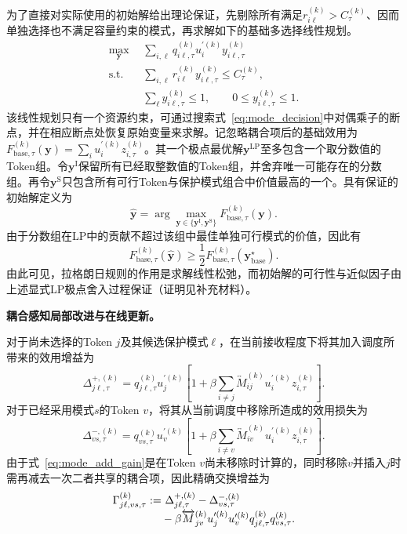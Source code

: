 \documentclass[journal]{IEEEtran}
\begin{document}
为了直接对实际使用的初始解给出理论保证，先剔除所有满足$r_{i\ell}^{(k)}>C_{\tau}^{(k)}$、因而单独选择也不满足容量约束的模式，再求解如下的基础多选择线性规划。
\begin{equation}
\begin{split}
\max_{\bm y}~~&\sum_{i,\ell}
q_{i\ell,\tau}^{(k)}u_i^{\prime(k)}y_{i\ell,\tau}^{(k)}\\
\mathrm{s.t.}~~&\sum_{i,\ell}r_{i\ell}^{(k)}y_{i\ell,\tau}^{(k)}
\leq C_{\tau}^{(k)},\\
&\sum_{\ell}y_{i\ell,\tau}^{(k)}\leq1,\qquad
0\leq y_{i\ell,\tau}^{(k)}\leq1.
\end{split}
\label{eq:base_lp}
\end{equation}
该线性规划只有一个资源约束，可通过搜索式~\eqref{eq:mode_decision}中对偶乘子的断点，并在相应断点处恢复原始变量来求解。记忽略耦合项后的基础效用为$F_{\mathrm{base},\tau}^{(k)}(\bm y)=\sum_i u_i^{\prime(k)}z_{i,\tau}^{(k)}$。其一个极点最优解$\bm y^{\mathrm{LP}}$至多包含一个取分数值的Token组。令$\bm y^{\mathrm I}$保留所有已经取整数值的Token组，并舍弃唯一可能存在的分数组。再令$\bm y^{\mathrm S}$只包含所有可行Token与保护模式组合中价值最高的一个。具有保证的初始解定义为
\begin{equation}
\widehat{\bm y}
=\arg\max_{\bm y\in\{\bm y^{\mathrm I},\bm y^{\mathrm S}\}}
F_{\mathrm{base},\tau}^{(k)}(\bm y).
\label{eq:lp_rounding}
\end{equation}
由于分数组在LP中的贡献不超过该组中最佳单独可行模式的价值，因此有
\begin{equation}
F_{\mathrm{base},\tau}^{(k)}(\widehat{\bm y})
\geq\frac12F_{\mathrm{base},\tau}^{(k)}(\bm y_{\mathrm{base}}^{\star}).
\label{eq:base_half_guarantee}
\end{equation}
由此可见，拉格朗日规则的作用是求解线性松弛，而初始解的可行性与近似因子由上述显式LP极点舍入过程保证（证明见补充材料）。

\textbf{耦合感知局部改进与在线更新。}

对于尚未选择的Token $j$及其候选保护模式$\ell$，在当前接收程度下将其加入调度所带来的效用增益为
\begin{equation}
\Delta_{j\ell,\tau}^{+,(k)}
=q_{j\ell,\tau}^{(k)}u_j^{\prime(k)}
\left[1+\beta\sum_{i\neq j}\overleftrightarrow M_{ij}^{(k)}u_i^{\prime(k)}z_{i,\tau}^{(k)}\right].
\label{eq:mode_add_gain}
\end{equation}
对于已经采用模式$s$的Token $v$，将其从当前调度中移除所造成的效用损失为
\begin{equation}
\Delta_{vs,\tau}^{-,(k)}
=q_{vs,\tau}^{(k)}u_v^{\prime(k)}
\left[1+\beta\sum_{i\neq v}\overleftrightarrow M_{iv}^{(k)}u_i^{\prime(k)}z_{i,\tau}^{(k)}\right].
\label{eq:mode_remove_loss}
\end{equation}
由于式~\eqref{eq:mode_add_gain}是在Token $v$尚未移除时计算的，同时移除$v$并插入$j$时需再减去一次二者共享的耦合项，因此精确交换增益为
\begin{align}
\Gamma_{j\ell,vs,\tau}^{(k)}
:=&~\Delta_{j\ell,\tau}^{+,(k)}-\Delta_{vs,\tau}^{-,(k)}
\notag\\[-0.2em]
&-\beta\overleftrightarrow M_{jv}^{(k)}u_j^{\prime(k)}u_v^{\prime(k)}
q_{j\ell,\tau}^{(k)}q_{vs,\tau}^{(k)}.
\label{eq:exact_swap_gain}
\end{align}
\end{document}
